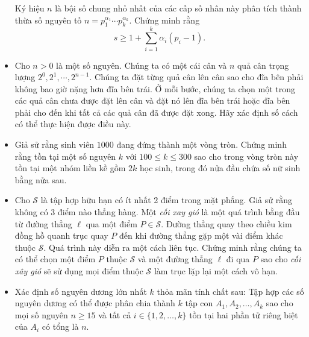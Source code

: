 \documentclass[11pt]{scrartcl}
\begin{document}
\begin{itemize}[label=, leftmargin=0em, itemsep=-0em]
\begin{btvn}
        Ký hiệu $n$ là bội số chung nhỏ nhất của các cấp số nhân này phân tích thành thừa số nguyên tố $n=p_1^{\alpha_1} \cdots p_k^{\alpha_k}$. Chứng minh rằng \[s \geq 1 + \sum^k_{i=1} \alpha_i (p_i - 1).\]
    \end{btvn}

    \item \begin{btvn} Cho $n > 0$ là một số nguyên. Chúng ta có một cái cân và $n$ quả cân trọng lượng $2^0, 2^1, \cdots, 2^{n-1}$. Chúng ta đặt từng quả cân lên cân sao cho đĩa bên phải không bao giờ nặng hơn đĩa bên trái. Ở mỗi bước, chúng ta chọn một trong các quả cân chưa được đặt lên cân và đặt nó lên đĩa bên trái hoặc đĩa bên phải cho đến khi tất cả các quả cân đã được đặt xong. Hãy xác định số cách có thể thực hiện được điều này.
    \end{btvn}

    \item \begin{btvn}
        Giả sử rằng sinh viên $1000$ đang đứng thành một vòng tròn. Chứng minh rằng tồn tại một số nguyên $k$ với $100 \leq k \leq 300$ sao cho trong vòng tròn này tồn tại một nhóm liền kề gồm $2k$ học sinh, trong đó nửa đầu chứa số nữ sinh bằng nửa sau.
    \end{btvn}

    \item \begin{btvn}
        Cho $\mathcal{S}$ là tập hợp hữu hạn có ít nhất 2 điểm trong mặt phẳng. Giả sử rằng không có 3 điểm nào thẳng hàng. Một \textit{cối xay gió} là một quá trình bằng đầu từ đường thẳng $\ell$ qua một điểm $P \in \mathcal{S}$. Đường thẳng quay theo chiều kim đồng hồ quanh trục quay $P$ đến khi đường thẳng gặp một vài điểm khác thuộc $\mathcal{S}$. Quá trình này diễn ra một cách liên tục. Chứng minh rằng chúng ta có thể chọn một điểm $P$ thuộc $\mathcal{S}$ và một đường thẳng $\ell$ đi qua $P$ sao cho \textit{cối xây gió} sẽ sử dụng mọi điểm thuộc $\mathcal{S}$ làm trục lặp lại một cách vô hạn.
    \end{btvn}

    \item \begin{btvn}
        Xác định số nguyên dương lớn nhất $k$ thỏa mãn tính chất sau: Tập hợp các số nguyên dương có thể được phân chia thành $k$ tập con $A_1, A_2, \ldots, A_k$ sao cho mọi số nguyên $n \geq 15$ và tất cả $i \in \{1, 2, \ldots, k\}$ tồn tại hai phần tử riêng biệt của $A_i$ có tổng là $n$.
    \end{btvn}


\end{itemize}
\end{document}
